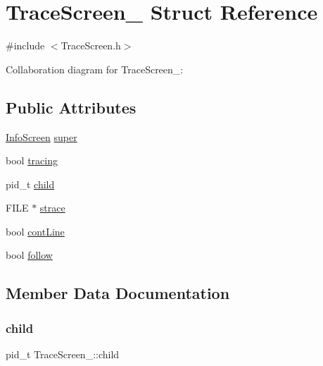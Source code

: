 \hypertarget{structTraceScreen__}{}\section{Trace\+Screen\+\_\+ Struct Reference}
\label{structTraceScreen__}


{\ttfamily \#include $<$Trace\+Screen.\+h$>$}



Collaboration diagram for Trace\+Screen\+\_\+\+:
\subsection*{Public Attributes}
\begin{DoxyCompactItemize}
\item 
\hyperlink{InfoScreen_8h_a97139d799c65bdbb53b127e2717369c8}{Info\+Screen} \hyperlink{structTraceScreen___a6804a30542e03a2ef2079a8547350a92}{super}
\item 
bool \hyperlink{structTraceScreen___abd5d096e7fd68d985255d6604be6e7d9}{tracing}
\item 
pid\+\_\+t \hyperlink{structTraceScreen___a3d2a93679c0d4d39d117830e8cb17d83}{child}
\item 
F\+I\+LE $\ast$ \hyperlink{structTraceScreen___ab68b0505faf1059d2bcbc054d9f499e3}{strace}
\item 
bool \hyperlink{structTraceScreen___a55e5c6f23c40fc41b7903a651093c80d}{cont\+Line}
\item 
bool \hyperlink{structTraceScreen___a8782dcafbe90afa1f4e0dbc35ddb0951}{follow}
\end{DoxyCompactItemize}


\subsection{Member Data Documentation}
\mbox{\label{structTraceScreen___a3d2a93679c0d4d39d117830e8cb17d83}} 
\subsubsection{\texorpdfstring{child}{child}}
{\footnotesize\ttfamily pid\+\_\+t Trace\+Screen\+\_\+\+::child}

\mbox{\label{structTraceScreen___a55e5c6f23c40fc41b7903a651093c80d}} 
